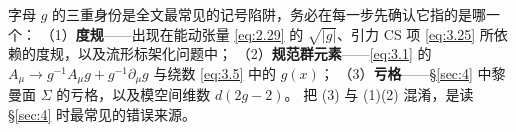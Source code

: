 \begin{yizhu}[易错点]
字母 $g$ 的三重身份是全文最常见的记号陷阱，务必在每一步先确认它指的是哪一个：
（1）\textbf{度规}——出现在能动张量 \eqref{eq:2.29} 的 $\sqrt{|g|}$、引力 CS 项 \eqref{eq:3.25} 所依赖的度规，以及流形标架化问题中；
（2）\textbf{规范群元素}——\eqref{eq:3.1} 的 $A_\mu\to g^{-1}A_\mu g+g^{-1}\partial_\mu g$ 与绕数 \eqref{eq:3.5} 中的 $g(x)$；
（3）\textbf{亏格}——\S\ref{sec:4} 中黎曼面 $\Sigma$ 的亏格，以及模空间维数 $d(2g-2)$。
把 (3) 与 (1)(2) 混淆，是读 \S\ref{sec:4} 时最常见的错误来源。
\end{yizhu}
